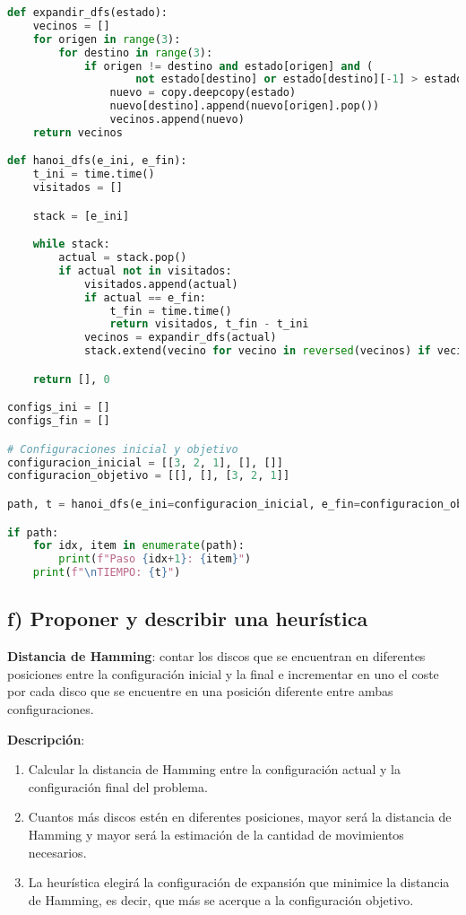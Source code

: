 \documentclass{article}
\begin{document}
\begin{tcolorbox}
\begin{lstlisting}[language=Python]
def expandir_dfs(estado):
    vecinos = []
    for origen in range(3):
        for destino in range(3):
            if origen != destino and estado[origen] and (
                    not estado[destino] or estado[destino][-1] > estado[origen][-1]):
                nuevo = copy.deepcopy(estado)
                nuevo[destino].append(nuevo[origen].pop())
                vecinos.append(nuevo)
    return vecinos

def hanoi_dfs(e_ini, e_fin):
    t_ini = time.time()
    visitados = []

    stack = [e_ini]

    while stack:
        actual = stack.pop()
        if actual not in visitados:
            visitados.append(actual)
            if actual == e_fin:
                t_fin = time.time()
                return visitados, t_fin - t_ini
            vecinos = expandir_dfs(actual)
            stack.extend(vecino for vecino in reversed(vecinos) if vecino not in visitados)

    return [], 0

configs_ini = []
configs_fin = []

# Configuraciones inicial y objetivo
configuracion_inicial = [[3, 2, 1], [], []]
configuracion_objetivo = [[], [], [3, 2, 1]]

path, t = hanoi_dfs(e_ini=configuracion_inicial, e_fin=configuracion_objetivo)

if path:
    for idx, item in enumerate(path):
        print(f"Paso {idx+1}: {item}")
    print(f"\nTIEMPO: {t}")
\end{lstlisting}
\end{tcolorbox}


\subsection*{f) Proponer y describir una heurística}
\textbf{Distancia de Hamming}: contar los discos que se encuentran en diferentes posiciones entre la configuración inicial y la final e incrementar en uno el coste por cada disco que se encuentre en una posición diferente entre ambas configuraciones.

\textbf{Descripción}:
\begin{enumerate}
    \item Calcular la distancia de Hamming entre la configuración actual y la configuración final del problema.
    \item Cuantos más discos estén en diferentes posiciones, mayor será la distancia de Hamming y mayor será la estimación de la cantidad de movimientos necesarios.
    \item La heurística elegirá la configuración de expansión que minimice la distancia de Hamming, es decir, que más se acerque a la configuración objetivo.
\end{enumerate}
\end{document}
